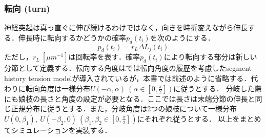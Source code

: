 \subsubsection{転向 (turn)}
神経突起は真っ直ぐに伸び続けるわけではなく，向きを時折変えながら伸長する．伸長時に転向するかどうかの確率$p_d(t_i)$を次のようにする．
\begin{equation}
p_d(t_i) = r_L\Delta L_j(t_i)
\end{equation}
ただし，$r_L\ [\mu m^{-1}]$は回転率を表す．確率$p_d(t_i)$により転向する部分は新しい分節として定義する．転向する角度は\citep{Koene2009-hv}では転向角度の履歴を考慮したsegment history tension modelが導入されているが，本書では前述のように省略する．代わりに転向角度は一様分布$U(-\alpha, \alpha)\ \left(\alpha\in \left[0, \frac{\pi}{2}\right]\right)$に従うとする．
分岐した際にも娘枝の長さと角度の設定が必要となる．ここでは長さは末端分節の伸長と同じ正規分布に従うとする．また，分岐角度は2つの娘枝について一様分布$U(0, \beta_1),\ U(-\beta_2, 0)\ \left(\beta_1, \beta_2\in \left[0, \frac{\pi}{2}\right]\right)$にそれぞれ従うとする．
以上をまとめてシミュレーションを実装する．
